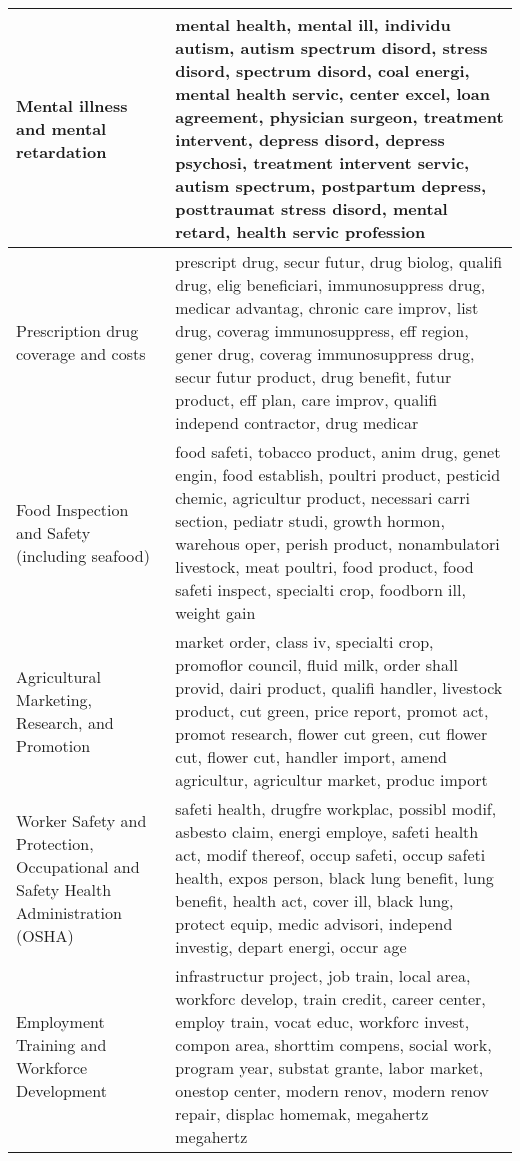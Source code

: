 \begin{longtable}{p{}p{}}
   \hline
Mental illness and mental retardation & mental health, mental ill, individu autism, autism spectrum disord, stress disord, spectrum disord, coal energi, mental health servic, center excel, loan agreement, physician surgeon, treatment intervent, depress disord, depress psychosi, treatment intervent servic, autism spectrum, postpartum depress, posttraumat stress disord, mental retard, health servic profession \\ 
   \hline
Prescription drug coverage and costs & prescript drug, secur futur, drug biolog, qualifi drug, elig beneficiari, immunosuppress drug, medicar advantag, chronic care improv, list drug, coverag immunosuppress, eff region, gener drug, coverag immunosuppress drug, secur futur product, drug benefit, futur product, eff plan, care improv, qualifi independ contractor, drug medicar \\ 
   \hline
Food Inspection and Safety (including seafood) & food safeti, tobacco product, anim drug, genet engin, food establish, poultri product, pesticid chemic, agricultur product, necessari carri section, pediatr studi, growth hormon, warehous oper, perish product, nonambulatori livestock, meat poultri, food product, food safeti inspect, specialti crop, foodborn ill, weight gain \\ 
   \hline
Agricultural Marketing, Research, and Promotion & market order, class iv, specialti crop, promoflor council, fluid milk, order shall provid, dairi product, qualifi handler, livestock product, cut green, price report, promot act, promot research, flower cut green, cut flower cut, flower cut, handler import, amend agricultur, agricultur market, produc import \\ 
   \hline
Worker Safety and Protection, Occupational and Safety Health Administration (OSHA) & safeti health, drugfre workplac, possibl modif, asbesto claim, energi employe, safeti health act, modif thereof, occup safeti, occup safeti health, expos person, black lung benefit, lung benefit, health act, cover ill, black lung, protect equip, medic advisori, independ investig, depart energi, occur age \\ 
   \hline
Employment Training and Workforce Development & infrastructur project, job train, local area, workforc develop, train credit, career center, employ train, vocat educ, workforc invest, compon area, shorttim compens, social work, program year, substat grante, labor market, onestop center, modern renov, modern renov repair, displac homemak, megahertz megahertz \\ 
   \hline

\end{longtable}
